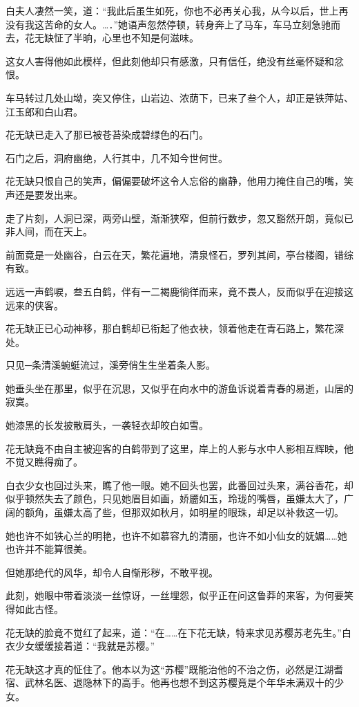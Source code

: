 \documentclass[12pt,oneside]{book}
\begin{document}
白夫人凄然一笑，道：``我此后虽生如死，你也不必再关心我，从今以后，世上再没有我这苦命的女人。\ldots．''她语声忽然停顿，转身奔上了马车，车马立刻急驰而去，花无缺怔了半晌，心里也不知是何滋味。

这女人害得他如此模样，但此刻他却只有感激，只有信任，绝没有丝毫怀疑和忿恨。

车马转过几处山坳，突又停住，山岩边、浓荫下，已来了叁个人，却正是铁萍姑、江玉郎和白山君。

花无缺已走入了那已被苍苔染成碧绿色的石门。

石门之后，洞府幽绝，人行其中，几不知今世何世。

花无缺只恨自己的笑声，偏偏要破坏这令人忘俗的幽静，他用力掩住自己的嘴，笑声还是要发出来。

走了片刻，人洞已深，两旁山壁，渐渐狭窄，但前行数步，忽又豁然开朗，竟似已非人间，而在天上。

前面竟是一处幽谷，白云在天，繁花遍地，清泉怪石，罗列其间，亭台楼阁，错综有致。

远远一声鹤唳，叁五白鹤，伴有一二褐鹿徜徉而来，竟不畏人，反而似乎在迎接这远来的侠客。

花无缺正已心动神移，那白鹤却已衔起了他衣袂，领着他走在青石路上，繁花深处。

只见─条清溪蜿蜓流过，溪旁俏生生坐着条人影。

她垂头坐在那里，似乎在沉思，又似乎在向水中的游鱼诉说着青春的易逝，山居的寂寞。

她漆黑的长发披散肩头，一袭轻衣却皎白如雪。

花无缺竟不由自主被迎客的白鹤带到了这里，岸上的人影与水中人影相互辉映，他不觉又瞧得痴了。

白衣少女也回过头来，瞧了他一眼。她不回头也罢，此番回过头来，满谷香花，却似乎顿然失去了颜色，只见她眉目如画，娇靥如玉，玲珑的嘴唇，虽嫌太大了，广阔的额角，虽嫌太高了些，但那双如秋月，如明星的眼珠，却足以补救这一切。

她也许不如铁心兰的明艳，也许不如慕容九的清丽，也许不如小仙女的妩媚\ldots\ldots 她也许并不能算很美。

但她那绝代的风华，却令人自惭形秽，不敢平视。

此刻，她眼中带着淡淡一丝惊讶，一丝埋怨，似乎正在问这鲁莽的来客，为何要笑得如此古怪。

花无缺的脸竟不觉红了起来，道：``在\ldots\ldots 在下花无缺，特来求见苏樱苏老先生。''白衣少女缓缓接着道：``我就是苏樱。''

花无缺这才真的怔住了。他本以为这``苏樱''既能治他的不治之伤，必然是江湖耆宿、武林名医、退隐林下的高手。他再也想不到这苏樱竟是个年华未满双十的少女。
\end{document}
